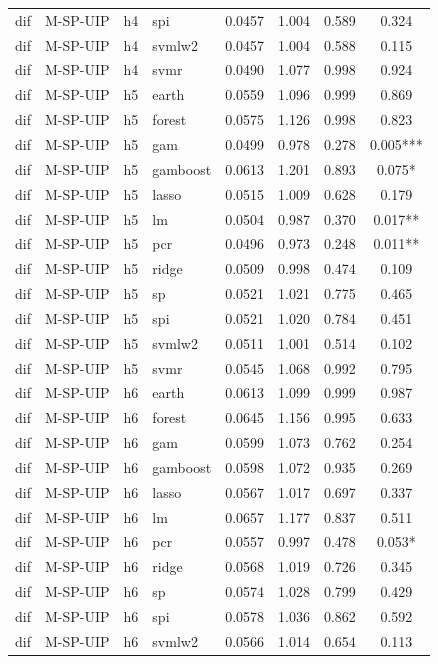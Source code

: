 \begin{ThreePartTable}
\begin{longtable}[t]{llclcccc}
dif & M-SP-UIP & h4 & spi & 0.0457 & 1.004 & 0.589 & 0.324\\
dif & M-SP-UIP & h4 & svmlw2 & 0.0457 & 1.004 & 0.588 & 0.115\\
dif & M-SP-UIP & h4 & svmr & 0.0490 & 1.077 & 0.998 & 0.924\\
\addlinespace
dif & M-SP-UIP & h5 & earth & 0.0559 & 1.096 & 0.999 & 0.869\\
dif & M-SP-UIP & h5 & forest & 0.0575 & 1.126 & 0.998 & 0.823\\
dif & M-SP-UIP & h5 & gam & 0.0499 & 0.978 & 0.278 & 0.005***\\
dif & M-SP-UIP & h5 & gamboost & 0.0613 & 1.201 & 0.893 & 0.075*\\
dif & M-SP-UIP & h5 & lasso & 0.0515 & 1.009 & 0.628 & 0.179\\
dif & M-SP-UIP & h5 & lm & 0.0504 & 0.987 & 0.370 & 0.017**\\
dif & M-SP-UIP & h5 & pcr & 0.0496 & 0.973 & 0.248 & 0.011**\\
dif & M-SP-UIP & h5 & ridge & 0.0509 & 0.998 & 0.474 & 0.109\\
dif & M-SP-UIP & h5 & sp & 0.0521 & 1.021 & 0.775 & 0.465\\
dif & M-SP-UIP & h5 & spi & 0.0521 & 1.020 & 0.784 & 0.451\\
dif & M-SP-UIP & h5 & svmlw2 & 0.0511 & 1.001 & 0.514 & 0.102\\
dif & M-SP-UIP & h5 & svmr & 0.0545 & 1.068 & 0.992 & 0.795\\
\addlinespace
dif & M-SP-UIP & h6 & earth & 0.0613 & 1.099 & 0.999 & 0.987\\
dif & M-SP-UIP & h6 & forest & 0.0645 & 1.156 & 0.995 & 0.633\\
dif & M-SP-UIP & h6 & gam & 0.0599 & 1.073 & 0.762 & 0.254\\
dif & M-SP-UIP & h6 & gamboost & 0.0598 & 1.072 & 0.935 & 0.269\\
dif & M-SP-UIP & h6 & lasso & 0.0567 & 1.017 & 0.697 & 0.337\\
dif & M-SP-UIP & h6 & lm & 0.0657 & 1.177 & 0.837 & 0.511\\
dif & M-SP-UIP & h6 & pcr & 0.0557 & 0.997 & 0.478 & 0.053*\\
dif & M-SP-UIP & h6 & ridge & 0.0568 & 1.019 & 0.726 & 0.345\\
dif & M-SP-UIP & h6 & sp & 0.0574 & 1.028 & 0.799 & 0.429\\
dif & M-SP-UIP & h6 & spi & 0.0578 & 1.036 & 0.862 & 0.592\\
dif & M-SP-UIP & h6 & svmlw2 & 0.0566 & 1.014 & 0.654 & 0.113\\

\end{longtable}
\end{ThreePartTable}
